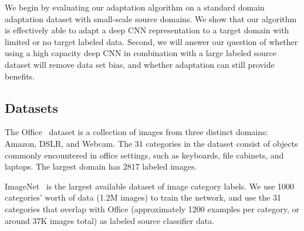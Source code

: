 \label{sec:eval}

We begin by evaluating our adaptation algorithm on a standard domain adaptation dataset with small-scale source domains.
We show that our algorithm is effectively able to adapt a deep CNN representation to a target domain with limited or no
target labeled data.
Second, we will answer our question of whether using a high capacity deep CNN in combination with a large labeled source dataset will remove data set 
bias, and whether adaptation can still provide benefits.



\subsection{Datasets}
The Office~\cite{saenko-eccv10} dataset is a collection of images from three
distinct domains: Amazon, DSLR, and Webcam. The 31 categories in the dataset
consist of objects commonly encountered in office settings, such as keyboards,
file cabinets, and laptops. The largest domain has 2817 labeled images.

ImageNet~\cite{ilsvrc2012} is the largest available dataset of image category labels. We use 1000 categories' worth of data (1.2M images) to train the network, and use the 31 categories that overlap with Office (approximately 1200 examples per category, or around 37K images total) as labeled source classifier data.

